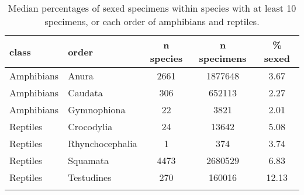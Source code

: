 \begin{longtable}{llccc}
\caption{Median percentages of sexed specimens within species with at least 
                   10 specimens, or each order of amphibians and reptiles.} \\ 
  \hline
class & order & n species & n specimens & \% sexed \\ 
  \hline
Amphibians & Anura & 2661 & 1877648 & 3.67 \\ 
  Amphibians & Caudata & 306 & 652113 & 2.27 \\ 
  Amphibians & Gymnophiona &  22 & 3821 & 2.01 \\ 
  Reptiles & Crocodylia &  24 & 13642 & 5.08 \\ 
  Reptiles & Rhynchocephalia &   1 & 374 & 3.74 \\ 
  Reptiles & Squamata & 4473 & 2680529 & 6.83 \\ 
  Reptiles & Testudines & 270 & 160016 & 12.13 \\ 
   \hline
\hline
\label{table-orders}
\end{longtable}
